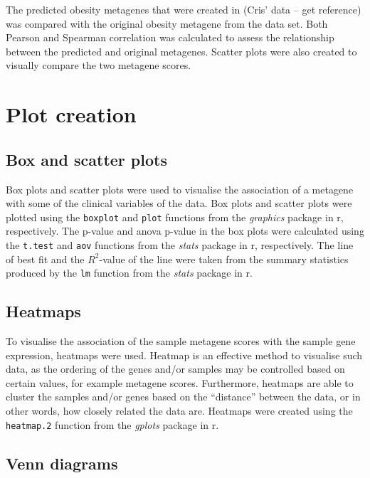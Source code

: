 
The predicted obesity metagenes that were created in (Cris' data -- get reference) was compared with the original obesity metagene from the \citet{Creighton2012} data set.
Both Pearson and Spearman correlation was calculated to assess the relationship between the predicted and original metagenes.
Scatter plots were also created to visually compare the two metagene scores.

\section{Plot creation}
\label{sec:plot_creation}

\subsection{Box and scatter plots}
\label{sub:box_and_scatter_plots}

Box plots and scatter plots were used to visualise the association of a metagene with some of the clinical variables of the data.
Box plots and scatter plots were plotted using the \texttt{boxplot} and \texttt{plot} functions from the \textit{graphics} package in \gls{r}, respectively.
The p-value and \gls{anova} p-value in the box plots were calculated using the \texttt{t.test} and \texttt{aov} functions from the \textit{stats} package in \gls{r}, respectively.
The line of best fit and the $R^2$-value of the line were taken from the summary statistics produced by the \texttt{lm} function from the \textit{stats} package in \gls{r}.

\subsection{Heatmaps}
\label{sub:heatmaps}

To visualise the association of the sample metagene scores with the sample gene expression, heatmaps were used.
Heatmap is an effective method to visualise such data, as the ordering of the genes and/or samples may be controlled based on certain values, for example metagene scores.
Furthermore, heatmaps are able to cluster the samples and/or genes based on the ``distance'' between the data, or in other words, how closely related the data are.
Heatmaps were created using the \texttt{heatmap.2} function from the \textit{gplots} package in \gls{r}.

\subsection{Venn diagrams}
\label{sub:venn_diagrams}
























